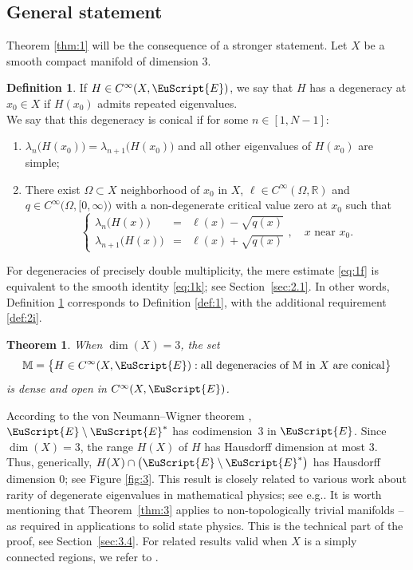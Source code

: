 \documentclass[10pt]{amsart}
\let\pazocal\EuScript
\newenvironment{enumeratei}
{\bgroup\def\theenumi{\roman{enumi}}\def\theenumii{\arabic{enumii}}\begin{enumerate}}
{\end{enumerate}\egroup}
\let\sep:
\newtheorem{theorem}[thm]{Theorem}
\theoremstyle{definition}
\newtheorem{defi}{Definition}
\newcommand{\EE}{\pazocal{E}}
\newcommand{\R}{\mathbb{R}}
\newcommand{\Mm}{\mathbb{M}}
\newcommand{\systeme}[1]{\left\{ \begin{matrix} #1 \end{matrix}\right.}
\providecommand{\eg}{e.g.}\providecommand{\ie}{i.e.}\providecommand{\etc}{etc.}\providecommand{\resp}{resp.}\providecommand{\cf}{cf.}
\begin{document}
\subsection{General statement}\label{sec:1.4} Theorem \ref{thm:1} will be the consequence of a stronger statement. Let $X$ be a smooth compact manifold of dimension 3.

\begin{defi}\label{def:2} If $H \in C^\infty(X,\EE)$, we say that $H$ has a degeneracy at $x_0 \in X$ if $H(x_0)$ admits repeated eigenvalues.\\
\indent We say that this degeneracy is conical if for some $n \in [1,N-1]$:
\begin{enumeratei}
\item\label{def:2i}
$\lambda_n\bigl( H(x_0) \bigr) = \lambda_{n+1}\bigl( H(x_0) \bigr)$ and all other eigenvalues of $H(x_0)$ are simple;
\item\label{def:2ii}
There exist $\Omega \subset X$ neighborhood of $x_0$ in $X$, $\ell \in C^\infty(\Omega,\R)$ and $q \in C^\infty\bigl(\Omega,[0,\infty)\bigr)$ with a non-degenerate critical value zero at $x_0$ such that
\begin{equation}\label{eq:1k}
\systeme{
\lambda_n\bigl(H(x)\bigr) & = & \ell(x) - \sqrt{q(x)}
\\[5pt]
\lambda_{n+1}\bigl(H(x)\bigr) & = & \ell(x) + \sqrt{q(x)}}, \quad x \text{ near } x_0.
\end{equation}
\end{enumeratei}
\end{defi}

For degeneracies of precisely double multiplicity, the mere estimate \eqref{eq:1f} is equivalent to the smooth identity \eqref{eq:1k}; see Section~\ref{sec:2.1}. In other words, Definition \ref{def:2} corresponds to Definition \ref{def:1}, with the additional requirement \eqref{def:2i}.

\begin{theorem}\label{thm:2} When $\dim(X) = 3$, the set
\begin{equation}\label{eq:1o}
\Mm = \bigl\{ H \in C^\infty(X,\EE) \sep \text{all degeneracies of M in $X$ are conical} \bigr\}
\end{equation}
is dense and open in $C^\infty(X,\EE)$.
\end{theorem}

According to the von Neumann--Wigner theorem \cite{NW29}, $\EE \setminus \EE^*$ has codimension~$3$ in $\EE$. Since $\dim(X) = 3$, the range $H(X)$ of $H$ has Hausdorff dimension at most $3$. Thus, generically, $H(X) \cap \left( \EE \setminus \EE^*\right)$ has Hausdorff dimension $0$; see Figure \ref{fig:3}. This result is closely related to various work about rarity of degenerate eigenvalues in mathematical physics; see \eg \cite{C91,A95,T99}.
It is worth mentioning that Theorem~\ref{thm:3} applies to non-topologically trivial manifolds -- as required in applications to solid state physics. This is the technical part of the proof, see Section~\ref{sec:3.4}. For related results valid when $X$ is a simply connected regions, we refer to \cite[\S4]{DP12}.
\end{document}
